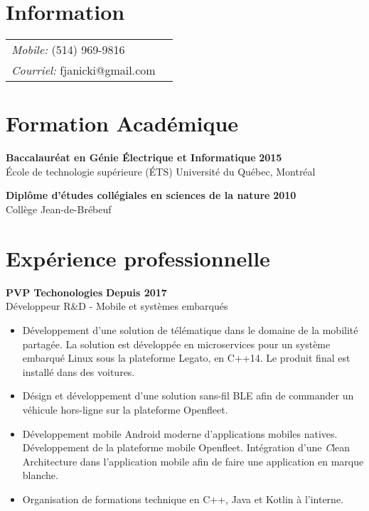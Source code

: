 \documentclass[margin,line]{res}
\begin{document}

\begin{resume}
  \section{\sc Information}
  \vspace{.05in}
  \begin{tabular}{@{}p{2in}p{4in}}
    {\it Mobile:}  (514) 969-9816      \\
    {\it Courriel:} fjanicki@gmail.com \\
  \end{tabular}


  \section{\sc Formation Académique}
   {\bf Baccalauréat en Génie Électrique et Informatique} \hfill {\bf 2015}\\
  École de technologie supérieure (ÉTS)
  Université du Québec, Montréal

  {\bf Diplôme d'études collégiales en sciences de la nature} \hfill {\bf 2010}\\
  Collège Jean-de-Brébeuf

  \section{\sc Expérience professionnelle}
   {\bf PVP Techonologies} \hfill {\bf Depuis 2017}\\
  Développeur R\&D - Mobile et systèmes embarqués\\
  \begin{itemize}
    \item Développement d'une solution de télématique dans le domaine de la mobilité partagée. La solution est développée en microservices pour un système embarqué Linux sous la plateforme Legato, en C++14. Le produit final est installé dans des voitures.
    \item Désign et développement d'une solution sans-fil BLE afin de commander un véhicule hors-ligne sur la plateforme Openfleet.
    \item Développement mobile Android moderne d'applications mobiles natives. Développement de la plateforme mobile Openfleet. Intégration d'une {\emph Clean Architecture} dans l'application mobile afin de faire une application en marque blanche.
    \item Organisation de formations technique en C++, Java et Kotlin à l'interne.
  \end{itemize}


\end{resume}
\end{document}
